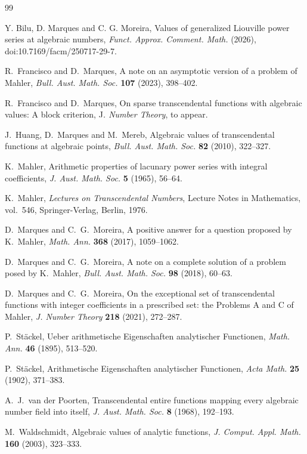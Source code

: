 \documentclass[10pt]{amsart}
\theoremstyle{definition}
\theoremstyle{remark}
\numberwithin{equation}{section}
\begin{document}
\begin{thebibliography}{99}

Y. Bilu, D. Marques and C. G. Moreira, Values of generalized Liouville
power series at algebraic numbers, \emph{Funct. Approx. Comment. Math.}
(2026), doi:10.7169/facm/250717-29-7.

R.~Francisco and D.~Marques,
A note on an asymptotic version of a problem of Mahler,
\emph{Bull. Aust. Math. Soc.} \textbf{107} (2023), 398--402.

R.~Francisco and D.~Marques,
On sparse transcendental functions with algebraic values: A block criterion,
J\textit{. Number Theory}, to appear.

J.~Huang, D.~Marques and M.~Mereb,
Algebraic values of transcendental functions at algebraic points,
\emph{Bull. Aust. Math. Soc.} \textbf{82} (2010), 322--327.

K.~Mahler,
Arithmetic properties of lacunary power series with integral coefficients,
\emph{J. Aust. Math. Soc.} \textbf{5} (1965), 56--64.

K.~Mahler,
\emph{Lectures on Transcendental Numbers},
Lecture Notes in Mathematics, vol.~546,
Springer-Verlag, Berlin, 1976.

D.~Marques and C.~G.~Moreira,
A positive answer for a question proposed by K.~Mahler,
\emph{Math. Ann.} \textbf{368} (2017), 1059--1062.

D.~Marques and C.~G.~Moreira,
A note on a complete solution of a problem posed by K.~Mahler,
\emph{Bull. Aust. Math. Soc.} \textbf{98} (2018), 60--63.

D.~Marques and C.~G.~Moreira,
On the exceptional set of transcendental functions with integer coefficients
in a prescribed set: the Problems A and C of Mahler,
\emph{J. Number Theory} \textbf{218} (2021), 272--287.

P.~St\"ackel,
Ueber arithmetische Eigenschaften analytischer Functionen,
\emph{Math. Ann.} \textbf{46} (1895), 513--520.

P.~St\"ackel,
Arithmetische Eigenschaften analytischer Functionen,
\emph{Acta Math.} \textbf{25} (1902), 371--383.


A.~J.~van der Poorten,
Transcendental entire functions mapping every algebraic number field into
itself,
\emph{J. Aust. Math. Soc.} \textbf{8} (1968), 192--193.

M.~Waldschmidt,
Algebraic values of analytic functions,
\emph{J. Comput. Appl. Math.} \textbf{160} (2003), 323--333.

\end{thebibliography}
\end{document}
